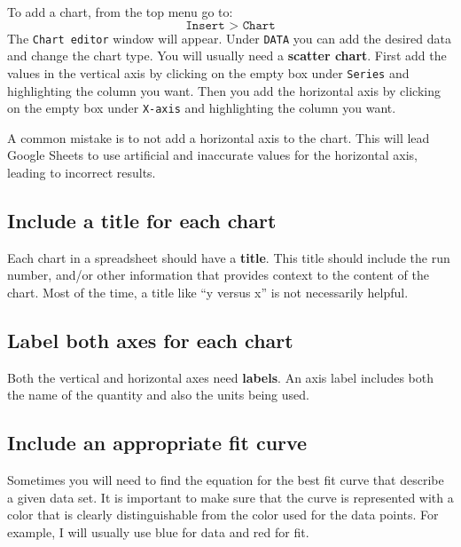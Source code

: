 To add a chart, from the top menu go to:
\begin{equation}
    \texttt{Insert > Chart}
\end{equation}
The \texttt{Chart editor} window will appear. Under \texttt{DATA} you can add the desired data and change the chart type. You will usually need a \textbf{scatter chart}. First add the values in the vertical axis by clicking on the empty box under \texttt{Series} and highlighting the column you want. Then you add the horizontal axis by clicking on the empty box under \texttt{X-axis} and highlighting the column you want.

A common mistake is to not add a horizontal axis to the chart. This will lead Google Sheets to use artificial and inaccurate values for the horizontal axis, leading to incorrect results.
\subsection{Include a title for each chart}
Each chart in a spreadsheet should have a \textbf{title}. This title should include the run number, and/or other information that provides context to the content of the chart. Most of the time, a title like ``y versus x'' is not necessarily helpful.
\subsection{Label both axes for each chart}
Both the vertical and horizontal axes need \textbf{labels}. An axis label includes both the name of the quantity and also the units being used.
\subsection{Include an appropriate fit curve}
Sometimes you will need to find the equation for the best fit curve that describe a given data set. It is important to make sure that the curve is represented with a color that is clearly distinguishable from the color used for the data points. For example, I will usually use blue for data and red for fit.

